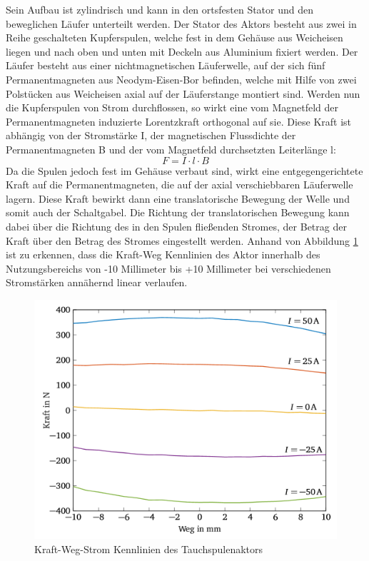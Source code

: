 Sein Aufbau ist zylindrisch und kann in den ortsfesten Stator und den beweglichen Läufer unterteilt werden. Der Stator des Aktors besteht aus zwei in Reihe geschalteten Kupferspulen, welche fest in dem Gehäuse aus Weicheisen liegen und nach oben und unten mit Deckeln aus Aluminium fixiert werden. Der Läufer besteht aus einer nichtmagnetischen Läuferwelle, auf der sich fünf Permanentmagneten aus Neodym-Eisen-Bor befinden, welche mit Hilfe von zwei Polstücken aus Weicheisen axial auf der Läuferstange montiert sind. 
Werden nun die Kupferspulen von Strom durchflossen, so wirkt eine vom Magnetfeld der Permanentmagneten induzierte Lorentzkraft orthogonal auf sie. Diese Kraft ist abhängig von der Stromstärke I, der magnetischen Flussdichte der Permanentmagneten B und der vom Magnetfeld durchsetzten Leiterlänge l:
\begin{equation}
F=I\cdot l\cdot B
\end{equation}
Da die Spulen jedoch fest im Gehäuse verbaut sind, wirkt eine entgegengerichtete Kraft auf die Permanentmagneten, die auf der axial verschiebbaren Läuferwelle lagern. Diese Kraft bewirkt dann eine translatorische Bewegung der Welle und somit auch der Schaltgabel. Die Richtung der translatorischen Bewegung kann dabei über die Richtung des in den Spulen fließenden Stromes, der Betrag der Kraft über den Betrag des Stromes eingestellt werden.
Anhand von Abbildung \ref{fig:Kennlinie Aktor} ist zu erkennen, dass die Kraft-Weg Kennlinien des Aktor innerhalb des Nutzungsbereichs von -10 Millimeter bis +10 Millimeter bei verschiedenen Stromstärken annähernd linear verlaufen. 

\begin{figure}[h]
	\centering
		\includegraphics{Bilder/Kennlinie Aktor.png}
	\caption{Kraft-Weg-Strom Kennlinien des Tauchspulenaktors \cite[S.12]{adp}}
	\label{fig:Kennlinie Aktor}
\end{figure}

